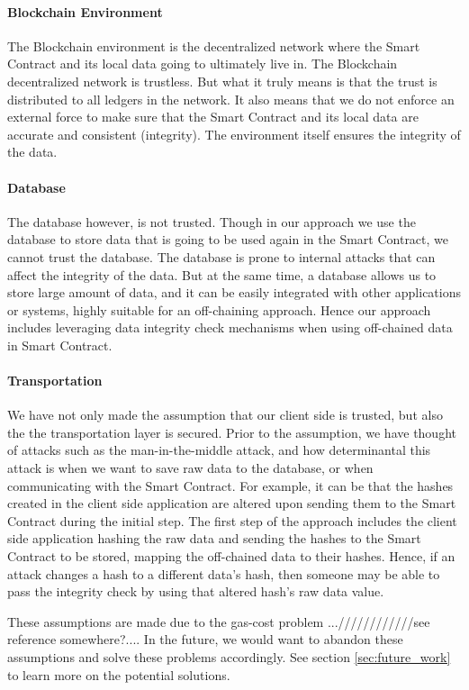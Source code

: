 \paragraph{Blockchain Environment}
The Blockchain environment is the decentralized network where the Smart Contract and its local data going to ultimately live in. The Blockchain decentralized network is trustless. But what it truly means is that the trust is distributed to all ledgers in the network. It also means that we do not enforce an external force to make sure that the Smart Contract and its local data are accurate and consistent (integrity). The environment itself ensures the integrity of the data. 

\paragraph{Database}
The database however, is not trusted. Though in our approach we use the database to store data that is going to be used again in the Smart Contract, we cannot trust the database. The database is prone to internal attacks that can affect the integrity of the data. But at the same time, a database allows us to store large amount of data, and it can be easily integrated with other applications or systems, highly suitable for an off-chaining approach. Hence our approach includes leveraging data integrity check mechanisms when using off-chained data in Smart Contract.

\paragraph{Transportation}
We have not only made the assumption that our client side is trusted, but also the the transportation layer is secured. Prior to the assumption, we have thought of attacks such as the man-in-the-middle attack, and how determinantal this attack is when we want to save raw data to the database, or when communicating with the Smart Contract. For example, it can be that the hashes created in the client side application are altered upon sending them to the Smart Contract during the initial step. The first step of the approach includes the client side application hashing the raw data and sending the hashes to the Smart Contract to be stored, mapping the off-chained data to their hashes. Hence, if an attack changes a hash to a different data’s hash, then someone may be able to pass the integrity check by using that altered hash’s raw data value. 

These assumptions are made due to the gas-cost problem ...////////////see reference somewhere?.... In the future, we would want to abandon these assumptions and solve these problems accordingly. See section \ref{sec:future_work} to learn more on the potential solutions.
